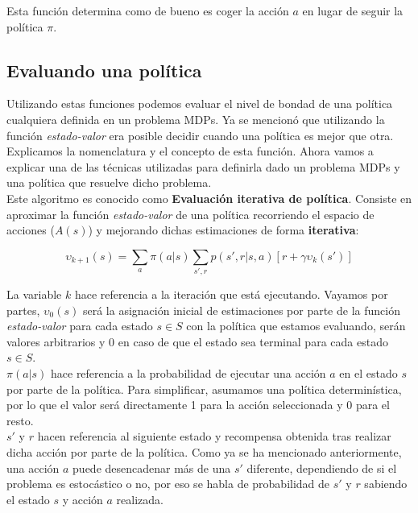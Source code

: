 \documentclass[11pt,fleqn]{book} %
\begin{document}
Esta función determina como de bueno es coger la acción $a$ en lugar de seguir la política $\pi$.


\subsection{Evaluando una política}\label{sec:evaluacion}

Utilizando estas funciones podemos evaluar el nivel de bondad de una política cualquiera definida en un problema MDPs. Ya se mencionó que utilizando la función \textit{estado-valor} era posible decidir cuando una política es mejor que otra. \\

Explicamos la nomenclatura y el concepto de esta función. Ahora vamos a explicar una de las técnicas utilizadas para definirla dado un problema MDPs y una política que resuelve dicho problema. \\

Este algoritmo es conocido como \textbf{Evaluación iterativa de política}. Consiste en aproximar la función \textit{estado-valor} de una política recorriendo el espacio de acciones ($A(s)$) y mejorando dichas estimaciones de forma \textbf{iterativa}:


\begin{equation}\label{eqn:1}
\upsilon_{k+1}(s)=\sum_a\pi(a|s) \sum_{s',r}p(s',r|s,a)\left[r+\gamma\upsilon_k(s')\right]
\end{equation}

La variable $k$ hace referencia a la iteración que está ejecutando. Vayamos por partes, $\upsilon_0(s)$ será la asignación inicial de estimaciones por parte de la función \textit{estado-valor} para cada estado $s \in S$ con la política que estamos evaluando, serán valores arbitrarios y 0 en caso de que el estado sea terminal para cada estado $s \in S$. \\

$\pi(a|s)$ hace referencia a la probabilidad de ejecutar una acción $a$ en el estado $s$ por parte de la política. Para simplificar, asumamos una política determinística, por lo que el valor será directamente 1 para la acción seleccionada y 0 para el resto. \\

$s'$ y $r$ hacen referencia al siguiente estado y recompensa obtenida tras realizar dicha acción por parte de la política. Como ya se ha mencionado anteriormente, una acción $a$ puede desencadenar más de una $s'$ diferente, dependiendo de si el problema es estocástico o no, por eso se habla de probabilidad de $s'$ y $r$ sabiendo el estado $s$ y acción $a$ realizada. \\
\end{document}
